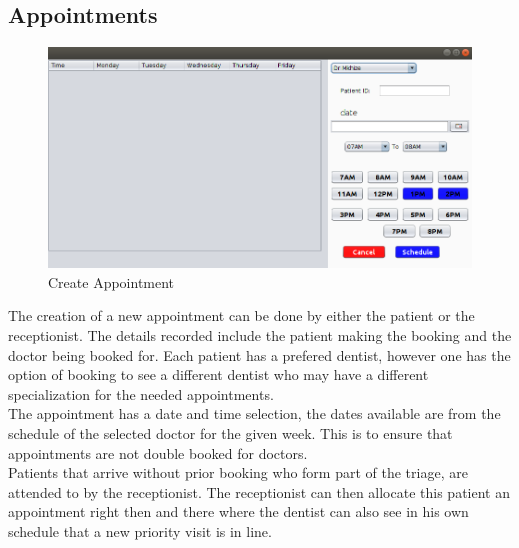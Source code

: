 \documentclass[11 pt]{article}
\begin{document}
\subsection{Appointments}
\begin{figure}[h]
\centering
\includegraphics[width=\linewidth]{new_appointment.png}
\caption{Create Appointment}
\label{fig:Appointment}
\end{figure}
The creation of a new appointment can be done by either the patient or the receptionist. The details recorded include the patient making the booking and the doctor being booked for. Each patient has a prefered dentist, however one has the option of booking to see a different dentist who may have a different specialization for the needed appointments. \\
The appointment has a date and time selection, the dates available are from the schedule of the selected doctor for the given week. This is to ensure that appointments are not double booked for doctors. \\
Patients that arrive without prior booking who form part of the triage, are attended to by the receptionist. The receptionist can then allocate this patient an appointment right then and there where the dentist can also see in his own schedule that a new priority visit is in line.
\end{document}
